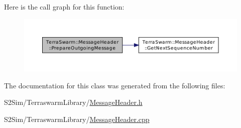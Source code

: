 Here is the call graph for this function\-:\nopagebreak
\begin{figure}[H]
\begin{center}
\leavevmode
\includegraphics[width=350pt]{class_terra_swarm_1_1_message_header_a6328694eb125adbac38c7e50d5fd40e1_cgraph}
\end{center}
\end{figure}




The documentation for this class was generated from the following files\-:\begin{DoxyCompactItemize}
\item 
S2\-Sim/\-Terraswarm\-Library/\hyperlink{_message_header_8h}{Message\-Header.\-h}\item 
S2\-Sim/\-Terraswarm\-Library/\hyperlink{_message_header_8cpp}{Message\-Header.\-cpp}\end{DoxyCompactItemize}
